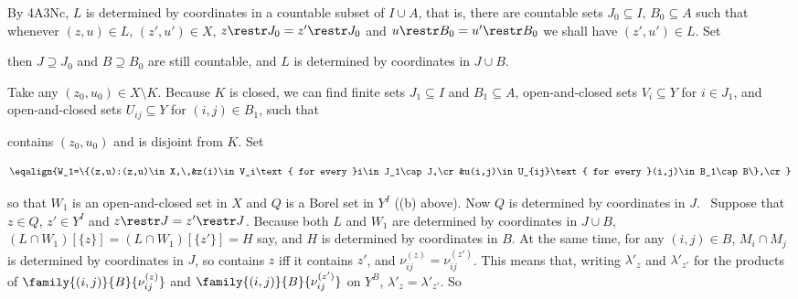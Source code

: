 {\medskip 
      
 By 4A3Nc, $L$ is determined by coordinates in a 
countable subset of $I\cup A$, that is, there are countable sets 
$J_0\subseteq I$, 
$B_0\subseteq A$ such that whenever $(z,u)\in L$, $(z',u')\in X$, 
$z\restr J_0=z'\restr J_0$ and $u\restr B_0=u'\restr B_0$ we shall have 
$(z',u')\in L$.   Set 
      
      
\noindent  then $J\supseteq J_0$ and $B\supseteq B_0$ are still 
countable, and $L$ is determined by coordinates in $J\cup B$. 
      
\medskip 
      
 Take any $(z_0,u_0)\in X\setminus K$.   Because $K$ is 
closed, we can find finite sets $J_1\subseteq I$ and $B_1\subseteq A$, 
open-and-closed sets $V_i\subseteq Y$ for $i\in J_1$, and 
open-and-closed sets $U_{ij}\subseteq Y$ for $(i,j)\in B_1$, such that 
      
      
\noindent contains $(z_0,u_0)$ and is disjoint from $K$.   Set 
      
$$\eqalign{W_1=\{(z,u):(z,u)\in X,\,&z(i)\in V_i\text{ for every }i\in 
J_1\cap J,\cr 
&u(i,j)\in U_{ij}\text{ for every }(i,j)\in B_1\cap B\},\cr}$$ 
      
      
\noindent so that $W_1$ is an open-and-closed set in $X$ and $Q$ is a 
Borel set in $Y^I$ ((b) above).   Now $Q$ is determined by coordinates 
in $J$. 
\Prf\ Suppose that $z\in Q$, $z'\in Y^I$ and $z\restr J=z'\restr J$. 
Because both $L$ and $W_1$ are determined by coordinates in $J\cup B$, 
$(L\cap W_1)[\{z\}]=(L\cap W_1)[\{z'\}]=H$ say, and $H$ is determined by 
coordinates in $B$.   At the same time, for any $(i,j)\in B$, 
$M_i\cap M_j$ is determined by coordinates in $J$, so contains $z$ iff 
it contains $z'$, and $\nu^{(z)}_{ij}=\nu^{(z')}_{ij}$.   This means 
that, writing $\lambda'_z$ and $\lambda'_{z'}$ for the products of 
$\family{(i,j)}{B}{\nu^{(z)}_{ij}}$ and 
$\family{(i,j)}{B}{\nu^{(z')}_{ij}}$ on $Y^B$, 
$\lambda'_z=\lambda'_{z'}$.   So 
      
      
}
